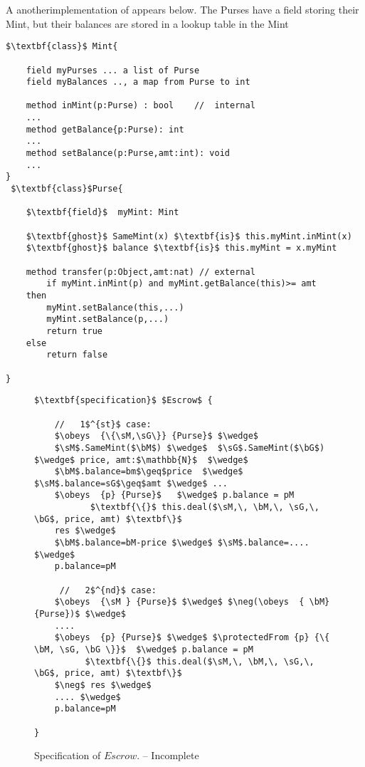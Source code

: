A anotherimplementation of  appears below. The Purses have a field storing their Mint, but their balances are stored in a 
lookup table in the Mint

\begin{lstlisting}[mathescape=true, language=Chainmail, frame=lines]
 $\textbf{class}$ Mint{

	field myPurses ... a list of Purse
	field myBalances .., a map from Purse to int
	
	method inMint(p:Purse) : bool    //  internal
	...	
	method getBalance{p:Purse): int
	...
	method setBalance(p:Purse,amt:int): void
	...	
}
 $\textbf{class}$Purse{
    
    $\textbf{field}$  myMint: Mint
     
    $\textbf{ghost}$ SameMint(x) $\textbf{is}$ this.myMint.inMint(x)
    $\textbf{ghost}$ balance $\textbf{is}$ this.myMint = x.myMint
    
    method transfer(p:Object,amt:nat) // external 
    	if myMint.inMint(p) and myMint.getBalance(this)>= amt 
	then
		myMint.setBalance(this,...)
		myMint.setBalance(p,...)
		return true
	else
		return false	
  
}
\end{lstlisting}



\begin{figure*}[t]
\begin{lstlisting}[mathescape=true, language=Chainmail, frame=lines]
$\textbf{specification}$ $Escrow$ {
    
    //   1$^{st}$ case:
    $\obeys  {\{\sM,\sG\}} {Purse}$ $\wedge$ 
    $\sM$.SameMint($\bM$) $\wedge$  $\sG$.SameMint($\bG$)  $\wedge$ price, amt:$\mathbb{N}$  $\wedge$
    $\bM$.balance=bm$\geq$price  $\wedge$  $\sM$.balance=sG$\geq$amt $\wedge$ ...
    $\obeys  {p} {Purse}$   $\wedge$ p.balance = pM
           $\textbf{\{}$ this.deal($\sM,\, \bM,\, \sG,\, \bG$, price, amt) $\textbf\}$
    res $\wedge$
    $\bM$.balance=bM-price $\wedge$ $\sM$.balance=....  $\wedge$
    p.balance=pM

     //   2$^{nd}$ case:
    $\obeys  {\sM } {Purse}$ $\wedge$ $\neg(\obeys  { \bM} {Purse})$ $\wedge$ 
    ....
    $\obeys  {p} {Purse}$ $\wedge$ $\protectedFrom {p} {\{ \bM, \sG, \bG \}}$  $\wedge$ p.balance = pM
          $\textbf{\{}$ this.deal($\sM,\, \bM,\, \sG,\, \bG$, price, amt) $\textbf\}$
    $\neg$ res $\wedge$
    .... $\wedge$
    p.balance=pM
     
}

\end{lstlisting}
\caption{Specification of  $Escrow$. -- Incomplete}
\label{fig:EscrowSpec}
 \end{figure*}